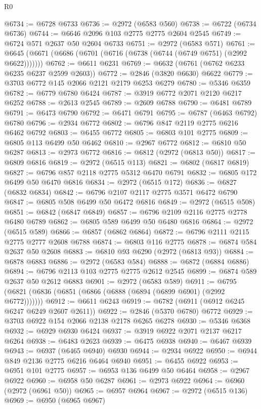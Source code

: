 \begin{lexlean}{R0}
\begin{coremodule}
@6734 := @6728 @6733
@6736 := @2972 (@6583 @560)
@6738 := @6722 (@6734 @6736)
@6744 := @6646 @2096 @103 @2775 @2775 @2604 @2545
@6749 := @6724 @571 @2637 @50 @2604 @6733
@6751 := @2972 (@6583 @571)
@6761 := @6645 (@6671 (@6686 (@6701 (@6716 (@6738 (@6744 (@6749 @6751) (@2992 @6622)))))))
@6762 := @6611 @6231
@6769 := @6632 (@6761 (@6762 @6233 @6235 @6237 @2599 @2603))
@6772 := @2846 (@3820 @6630) @6622
@6779 := @3703 @6772 @145 @2066 @2121 @2179 @6253 @6279
@6780 := @5346 @6359
@6782 := @6779 @6780 @6424
@6787 := @3919 @6772 @2071 @2120 @6217 @6252
@6788 := @2613 @2545
@6789 := @2609 @6788
@6790 := @6481 @6789
@6791 := @6473 @6790
@6792 := @6471 @6791
@6795 := @6787 (@6463 @6792) @6780
@6796 := @2934 @6772
@6802 := @6796 @847 @2119 @2775 @6216 @6462 @6792
@6803 := @6455 @6772
@6805 := @6803 @101 @2775
@6809 := @6805 @113 @6499 @50 @6462
@6810 := @2967 @6772
@6812 := @6810 @50 @6287
@6813 := @2973 @6772
@6816 := @6812 (@2972 (@6813 @50))
@6817 := @6809 @6816
@6819 := @2972 (@6515 @113)
@6821 := @6802 (@6817 @6819)
@6827 := @6796 @857 @2118 @2775 @5312 @6470 @6791
@6832 := @6805 @172 @6499 @50 @6470 @6816
@6834 := @2972 (@6515 @172)
@6836 := @6827 (@6832 @6834)
@6842 := @6796 @2107 @2117 @2775 @3571 @6472 @6790
@6847 := @6805 @508 @6499 @50 @6472 @6816
@6849 := @2972 (@6515 @508)
@6851 := @6842 (@6847 @6849)
@6857 := @6796 @2109 @2116 @2775 @2778 @6480 @6789
@6862 := @6805 @589 @6499 @50 @6480 @6816
@6864 := @2972 (@6515 @589)
@6866 := @6857 (@6862 @6864)
@6872 := @6796 @2111 @2115 @2775 @2777 @2608 @6788
@6874 := @6803 @116 @2775
@6878 := @6874 @584 @2637 @50 @2608
@6883 := @6810 @93 @6290 (@2972 (@6813 @93))
@6884 := @6878 @6883
@6886 := @2972 (@6583 @584)
@6888 := @6872 (@6884 @6886)
@6894 := @6796 @2113 @103 @2775 @2775 @2612 @2545
@6899 := @6874 @589 @2637 @50 @2612 @6883
@6901 := @2972 (@6583 @589)
@6911 := @6795 (@6821 (@6836 (@6851 (@6866 (@6888 (@6894 (@6899 @6901) (@2992 @6772)))))))
@6912 := @6611 @6243
@6919 := @6782 (@6911 (@6912 @6245 @6247 @6249 @2607 @2611))
@6922 := @2846 (@5370 @6780) @6772
@6929 := @3703 @6922 @154 @2066 @2138 @2178 @6265 @6278
@6930 := @5346 @6368
@6932 := @6929 @6930 @6424
@6937 := @3919 @6922 @2071 @2137 @6217 @6264
@6938 := @6483 @2623
@6939 := @6475 @6938
@6940 := @6467 @6939
@6943 := @6937 (@6465 @6940) @6930
@6944 := @2934 @6922
@6950 := @6944 @849 @2136 @2775 @6216 @6464 @6940
@6951 := @6455 @6922
@6953 := @6951 @101 @2775
@6957 := @6953 @136 @6499 @50 @6464
@6958 := @2967 @6922
@6960 := @6958 @50 @6287
@6961 := @2973 @6922
@6964 := @6960 (@2972 (@6961 @50))
@6965 := @6957 @6964
@6967 := @2972 (@6515 @136)
@6969 := @6950 (@6965 @6967)

\end{coremodule}
\end{lexlean}
